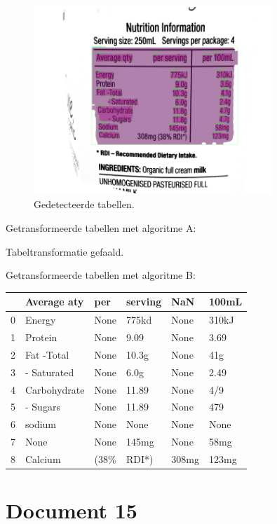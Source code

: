 \begin{figure}[H]
    \centering
    \includegraphics[width=0.8\textwidth]{test-resultaten/14/original_b/detected_tables.png}
    \caption{Gedetecteerde tabellen.}
\end{figure}

Getransformeerde tabellen met algoritme A:

Tabeltransformatie gefaald.

Getransformeerde tabellen met algoritme B:

\begin{tabular}{llllll}
\toprule
{} &   Average aty &   per & serving &    NaN &  100mL \\
\midrule
0 &        Energy &  None &   775kd &   None &  310kJ \\
1 &       Protein &  None &    9.09 &   None &   3.69 \\
2 &    Fat -Total &  None &   10.3g &   None &    41g \\
3 &   - Saturated &  None &    6.0g &   None &   2.49 \\
4 &  Carbohydrate &  None &   11.89 &   None &    4/9 \\
5 &      - Sugars &  None &   11.89 &   None &    479 \\
6 &        sodium &  None &    None &   None &   None \\
7 &          None &  None &   145mg &   None &   58mg \\
8 &       Calcium &  (38\% &   RDI*) &  308mg &  123mg \\
\bottomrule
\end{tabular}
\section{Document 15}

